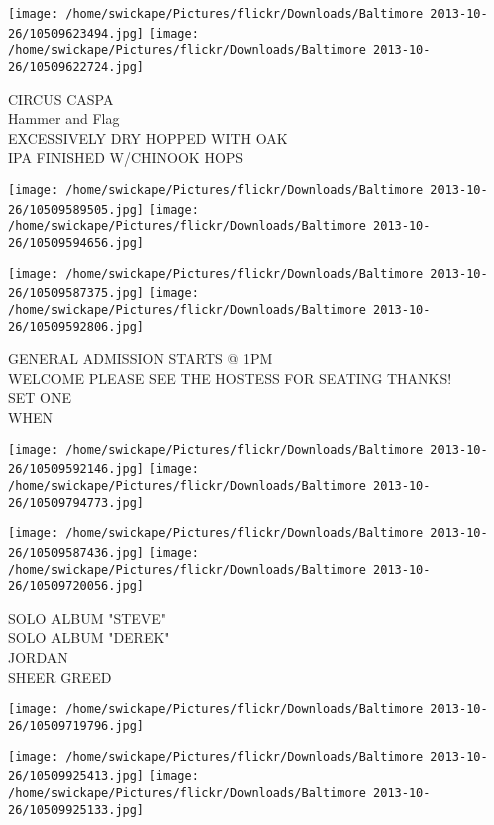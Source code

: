 \documentclass[10pt,letterpaper]{article}
\begin{document}
\texttt{[image: /home/swickape/Pictures/flickr/Downloads/Baltimore 2013-10-26/10509623494.jpg]}
\texttt{[image: /home/swickape/Pictures/flickr/Downloads/Baltimore 2013-10-26/10509622724.jpg]}

CIRCUS CASPA\\
Hammer and Flag\\
EXCESSIVELY DRY HOPPED WITH OAK\\
IPA FINISHED W/CHINOOK HOPS\\
\pagebreak

\texttt{[image: /home/swickape/Pictures/flickr/Downloads/Baltimore 2013-10-26/10509589505.jpg]}
\texttt{[image: /home/swickape/Pictures/flickr/Downloads/Baltimore 2013-10-26/10509594656.jpg]}

\texttt{[image: /home/swickape/Pictures/flickr/Downloads/Baltimore 2013-10-26/10509587375.jpg]}
\texttt{[image: /home/swickape/Pictures/flickr/Downloads/Baltimore 2013-10-26/10509592806.jpg]}

GENERAL ADMISSION STARTS @ 1PM\\
WELCOME PLEASE SEE THE HOSTESS FOR SEATING THANKS!\\
SET ONE\\
WHEN\\
\pagebreak

\texttt{[image: /home/swickape/Pictures/flickr/Downloads/Baltimore 2013-10-26/10509592146.jpg]}
\texttt{[image: /home/swickape/Pictures/flickr/Downloads/Baltimore 2013-10-26/10509794773.jpg]}

\texttt{[image: /home/swickape/Pictures/flickr/Downloads/Baltimore 2013-10-26/10509587436.jpg]}
\texttt{[image: /home/swickape/Pictures/flickr/Downloads/Baltimore 2013-10-26/10509720056.jpg]}

SOLO ALBUM "STEVE"\\
SOLO ALBUM "DEREK"\\
JORDAN\\
SHEER GREED\\
\pagebreak

\texttt{[image: /home/swickape/Pictures/flickr/Downloads/Baltimore 2013-10-26/10509719796.jpg]}

\vspace{0.25in}
\texttt{[image: /home/swickape/Pictures/flickr/Downloads/Baltimore 2013-10-26/10509925413.jpg]}
\texttt{[image: /home/swickape/Pictures/flickr/Downloads/Baltimore 2013-10-26/10509925133.jpg]}
\end{document}
